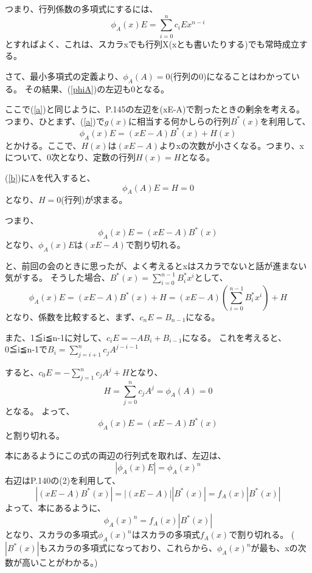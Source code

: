\documentclass{jsarticle}
\begin{document}
つまり、行列係数の多項式にするには、
\begin{equation}
\label{phiA}
\phi_A(x)E = \sum_{i=0}^n c_iE x^{n-i}
\end{equation}
とすればよく、これは、スカラxでも行列X(xとも書いたりする)でも常時成立する。

さて、最小多項式の定義より、$\phi_A(A) = 0$(行列の0)になることはわかっている。
その結果、(\ref{phiA})の左辺も0となる。

ここで(\ref{a})と同じように、P.145の左辺を(xE-A)で割ったときの剰余を考える。
つまり、ひとまず、(\ref{a})で$g(x)$に相当する何かしらの行列$B^* (x)$を利用して、
\begin{equation}
\label{b}
\phi_A(x)E = (xE - A)B^* (x) + H(x)
\end{equation}
とかける。ここで、$H(x)$は$(xE - A)$よりxの次数が小さくなる。つまり、xについて、0次となり、定数の行列$H(x) = H$となる。

(\ref{b})にAを代入すると、
\begin{equation}
\label{b}
\phi_A(A)E = H = 0
\end{equation}
となり、$H=0$(行列)が求まる。

つまり、
\begin{equation}
\label{b}
\phi_A(x)E = (xE - A)B^* (x)
\end{equation}
となり、$\phi_A(x)E$は$(xE - A)$で割り切れる。

と、前回の会のときに思ったが、よく考えるとxはスカラでないと話が進まない気がする。
そうした場合、$B^* (x) = \sum_{i=0}^{n-1} B_i^* x^i$として、
\begin{equation}
\phi_A(x)E = (xE - A)B^* (x) + H = (xE - A)(\sum_{i=0}^{n-1} B_i^* x^i) + H
\end{equation}
となり、係数を比較すると、まず、$c_n E = B_{n-1}$になる。

また、1≦i≦n-1に対して、$c_i E = -A B_i + B_{i-1}$になる。
これを考えると、0≦i≦n-1で$B_i = \sum_{j = i + 1}^{n} c_j A^{j-i-1}$

すると、$c_0 E = - \sum_{j = 1}^{n} c_j A^{j} + H$となり、
\begin{equation}
H = \sum_{j = 0}^{n} c_j A^{j} = \phi_A(A) = 0
\end{equation}
となる。
よって、
\begin{equation}
\phi_A(x)E = (xE - A)B^* (x)
\end{equation}
と割り切れる。

本にあるようにこの式の両辺の行列式を取れば、左辺は、
\begin{equation}
|\phi_A(x)E| = {\phi_A(x)}^n
\end{equation}
右辺はP.140の(2)を利用して、
\begin{equation}
|(xE - A)B^* (x)| = |(xE - A)||B^* (x)| = f_A(x)|B^* (x)|
\end{equation}
よって、本にあるように、
\begin{equation}
{\phi_A(x)}^n = f_A(x)|B^* (x)|
\end{equation}
となり、スカラの多項式${\phi_A(x)}^n$はスカラの多項式$f_A(x)$で割り切れる。
($|B^* (x)|$もスカラの多項式になっており、これらから、${\phi_A(x)}^n$が最も、xの次数が高いことがわかる。)
\end{document}

